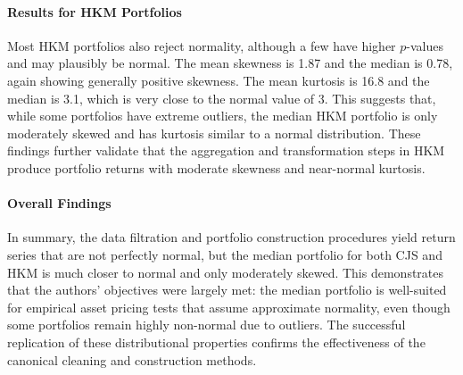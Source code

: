 \documentclass[11pt]{article}
\begin{document}
\paragraph{Results for HKM Portfolios}
Most HKM portfolios also reject normality, although a few have higher $p$-values and may plausibly be normal. The mean skewness is 1.87 and the median is 0.78, again showing generally positive skewness. The mean kurtosis is 16.8 and the median is 3.1, which is very close to the normal value of 3. This suggests that, while some portfolios have extreme outliers, the median HKM portfolio is only moderately skewed and has kurtosis similar to a normal distribution. These findings further validate that the aggregation and transformation steps in HKM produce portfolio returns with moderate skewness and near-normal kurtosis.

\paragraph{Overall Findings}
In summary, the data filtration and portfolio construction procedures yield return series that are not perfectly normal, but the median portfolio for both CJS and HKM is much closer to normal and only moderately skewed. This demonstrates that the authors' objectives were largely met: the median portfolio is well-suited for empirical asset pricing tests that assume approximate normality, even though some portfolios remain highly non-normal due to outliers. The successful replication of these distributional properties confirms the effectiveness of the canonical cleaning and construction methods.



\end{document}
